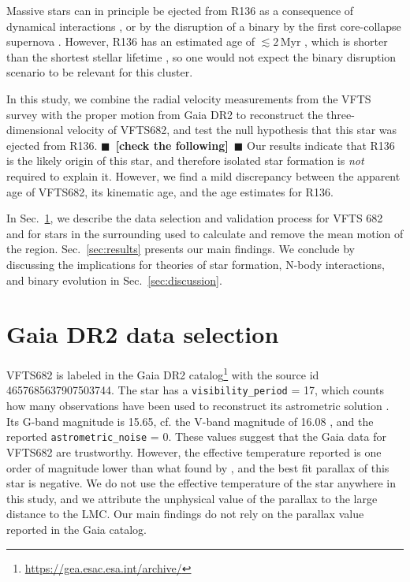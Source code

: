 \documentclass{aa}
\newcommand{\todo}[1]{{\large $\blacksquare$~\textbf{\color{red}[#1]}}~$\blacksquare$}
\DeclareRobustCommand{\Secref}[1]{Sec.~\ref{#1}}
\begin{document}
Massive stars can in principle be ejected from R136 as a consequence of dynamical
interactions \citep[][]{poveda:67,leonard:91, evans:10, fujii:11,
  allison:12, oh:16}, or by the disruption of a binary by the first
core-collapse supernova
\citep[][]{zwicky:57,blaauw:61,dedonder:97,eldridge:11,renzo:18}. However,
R136 has an estimated age of $\lesssim2$\,Myr \citep[][]{sabbi:12}, which is
shorter than the shortest stellar lifetime
\citep[$\sim$3\,Myr, e.g.,][]{zapartas:17}, so one would not expect the binary
disruption scenario to be relevant for this cluster.


In this study, we combine the radial velocity measurements from the
VFTS survey \citep[][]{evans:11} with the proper motion from Gaia DR2
to reconstruct the three-dimensional velocity of VFTS682, and test the
null hypothesis that this star was ejected from R136. \todo{check the
  following} Our results indicate that R136 is the likely origin of
this star, and therefore isolated star formation is \emph{not}
required to explain it. However, we find a mild discrepancy between the
apparent age of VFTS682, its kinematic age, and the age estimates for
R136. 

In \Secref{sec:sample}, we describe the data selection and validation
process for VFTS 682 and for stars in the surrounding used to
calculate and remove the mean motion of the
region. \Secref{sec:results} presents our main findings. We conclude
by discussing the implications for theories of
star formation, N-body interactions, and binary evolution in
\Secref{sec:discussion}.

\section{Gaia DR2 data selection}
\label{sec:sample}

VFTS682 is labeled in the Gaia DR2
catalog\footnote{\url{https://gea.esac.esa.int/archive/}} with the
source id 4657685637907503744. The star has a
\texttt{visibility\_period} = 17, which counts how many observations have
been used to reconstruct its astrometric solution \citep[][]{lindengren:18}. Its G-band
magnitude is 15.65, cf. the V-band magnitude of 16.08
\citep[][]{evans:11, bestenlehner:11}, and the reported
\texttt{astrometric\_noise} = 0. These values suggest that the Gaia
data for VFTS682 are trustworthy. However, the effective temperature
reported is one order of magnitude lower than what found by
\cite{bestenlehner:11}, and the best fit parallax of this star is
negative. We do not use the effective temperature of the star anywhere
in this study, and we attribute the unphysical value of the parallax
to the large distance to the LMC. Our main findings do not rely on the
parallax value reported in the Gaia catalog.
\end{document}
